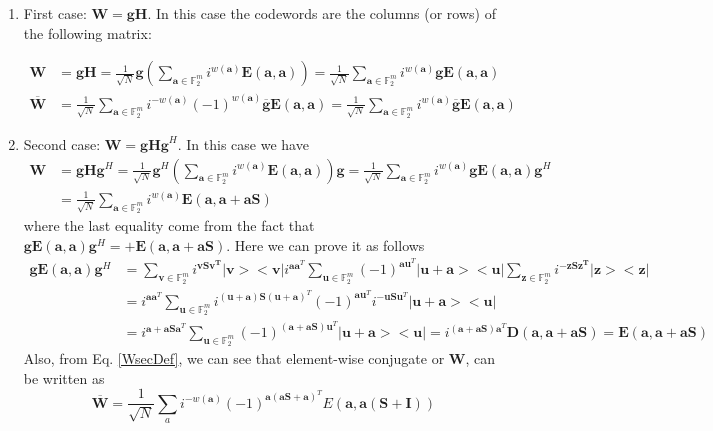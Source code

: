 \documentclass{article}
\begin{document}
\begin{enumerate}
	\item First case:
	$\mathbf{W=gH}$. In this case the codewords are the columns (or rows) of the following matrix:
	
	\begin{align}
		\mathbf{W} &= \mathbf{g}\mathbf{H} = \frac{1}{\sqrt{N}}\mathbf{g}\left(\sum_{\mathbf{a} \in \mathbb{F}^m_2} i^{w(\mathbf{a})}\mathbf{E}(\mathbf{a},\mathbf{a})\right) = \frac{1}{\sqrt{N}}\sum_{\mathbf{a} \in \mathbb{F}^m_2} i^{w(\mathbf{a})}\mathbf{g}\mathbf{E}(\mathbf{a},\mathbf{a}) \label{WfirstDef} \\
		\overline{\mathbf{W}} &= \frac{1}{\sqrt{N}}\sum_{\mathbf{a} \in \mathbb{F}^m_2} i^{-w(\mathbf{a})}(-1)^{w(\mathbf{a})}\overline{\mathbf{g}}\mathbf{E}(\mathbf{a},\mathbf{a}) = \frac{1}{\sqrt{N}}\sum_{\mathbf{a} \in \mathbb{F}^m_2} i^{w(\mathbf{a})}\overline{\mathbf{g}}\mathbf{E}(\mathbf{a},\mathbf{a}) \label{WbarFirstDef}
	\end{align}
	\item Second case: $\mathbf{W=gHg}^H$. In this case we have
	\begin{align}
		\mathbf{W} &= \mathbf{g}\mathbf{H}\mathbf{g}^H = \frac{1}{\sqrt{N}}\mathbf{g}^H\left(\sum_{\mathbf{a} \in \mathbb{F}^m_2} i^{w(\mathbf{a})}\mathbf{E}(\mathbf{a},\mathbf{a})\right)\mathbf{g} = \frac{1}{\sqrt{N}}\sum_{\mathbf{a} \in \mathbb{F}^m_2} i^{w(\mathbf{a})}\mathbf{g}\mathbf{E}(\mathbf{a},\mathbf{a})\mathbf{g}^H\nonumber  \\ 
		&=\frac{1}{\sqrt{N}}\sum_{\mathbf{a} \in \mathbb{F}^m_2} i^{w(\mathbf{a})}\mathbf{E}(\mathbf{a, a+aS}) \label{WsecDef}
	\end{align}
	where the last equality come from the fact that $\mathbf{g}\mathbf{E}(\mathbf{a},\mathbf{a}) \mathbf{g}^H = +\mathbf{E}(\mathbf{a,a+a S})$. Here we can prove it as follows
	\begin{align*}
		\mathbf{g} \mathbf{E}(\mathbf{a,a}) \mathbf{g}^H &=\sum_{\mathbf{v} \in \mathbb{F}^m_2}{i^{\mathbf{v S v^T}} |\mathbf{v}><\mathbf{v}|} i^{\mathbf{a}\mathbf{a}^T}\sum_{\mathbf{u} \in \mathbb{F}^m_2}{(-1)^{\mathbf{a}\mathbf{u}^T} |\mathbf{u+a}><\mathbf{u}|}\sum_{\mathbf{z} \in \mathbb{F}^m_2}{i^{-\mathbf{z S z^T}} |\mathbf{z}><\mathbf{z}|} \nonumber \\
		&= i^{\mathbf{a}\mathbf{a}^T}\sum_{\mathbf{u} \in \mathbb{F}^m_2}{i^{\mathbf{(u+a)S}(\mathbf{u+a})^T} (-1)^{\mathbf{a}\mathbf{u}^T}i^{-\mathbf{uS}\mathbf{u}^T} |\mathbf{u+a}><\mathbf{u}|} \nonumber \\
		&= i^{\mathbf{a+aS}\mathbf{a}^T}\sum_{\mathbf{u} \in \mathbb{F}^m_2}{(-1)^{(\mathbf{a+aS})\mathbf{u}^T} |\mathbf{u+a}><\mathbf{u}|}= i^{(\mathbf{a+aS})\mathbf{a}^T}\mathbf{D}(\mathbf{a, a+aS}) = \mathbf{E}(\mathbf{a, a+aS})
	\end{align*}
	Also, from Eq. \ref{WsecDef}, we can see that element-wise conjugate or $\mathbf{W}$, can be written as
	\begin{equation}\label{WbarSecDef}
		\overline{\mathbf{W}} = \frac{1}{\sqrt{N}} \sum_a i^{-w(\mathbf{a})}(-1)^{\mathbf{a}(\mathbf{a}\mathbf{S} + \mathbf{a})^T} E(\mathbf{a}, \mathbf{a}(\mathbf{S} + \mathbf{I}))
	\end{equation}
\end{enumerate}
\end{document}
